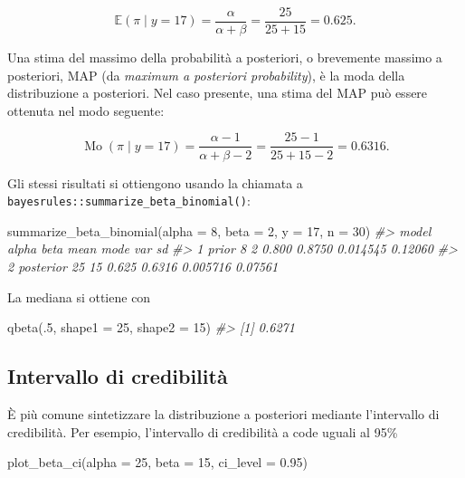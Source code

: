 \documentclass[
  11pt,
]{krantz}
\makeatletter
\newenvironment{Shaded}{\begin{snugshade}}{\end{snugshade}}
\newcommand{\AttributeTok}[1]{\textcolor[rgb]{0.61,0.61,0.61}{#1}}
\newcommand{\CommentTok}[1]{\textcolor[rgb]{0.37,0.37,0.37}{\textit{#1}}}
\newcommand{\DecValTok}[1]{\textcolor[rgb]{0.06,0.06,0.06}{#1}}
\newcommand{\FloatTok}[1]{\textcolor[rgb]{0.06,0.06,0.06}{#1}}
\newcommand{\FunctionTok}[1]{\textcolor[rgb]{0,0,0}{#1}}
\newcommand{\NormalTok}[1]{#1}
\newenvironment{kframe}{%
\medskip{}
\setlength{\fboxsep}{.8em}
 \def\at@end@of@kframe{}%
 \ifinner\ifhmode%
  \def\at@end@of@kframe{\end{minipage}}%
  \begin{minipage}{\columnwidth}%
 \fi\fi%
 \def\FrameCommand##1{\hskip\@totalleftmargin \hskip-\fboxsep
 \colorbox{shadecolor}{##1}\hskip-\fboxsep
     \hskip-\linewidth \hskip-\@totalleftmargin \hskip\columnwidth}%
 \MakeFramed {\advance\hsize-\width
   \@totalleftmargin\z@ \linewidth\hsize
   \@setminipage}}%
 {\par\unskip\endMakeFramed%
 \at@end@of@kframe}
\renewenvironment{Shaded}{\begin{kframe}}{\end{kframe}}
\DeclareMathOperator{\Mo}{Mo} %
\newcommand{\E}{\mathbb{E}} %
\theoremstyle{definition}
\theoremstyle{definition}
\theoremstyle{definition}
\theoremstyle{definition}
\theoremstyle{remark}
\makeatother
\begin{document}
\[
\E(\pi \mid y = 17) = \frac{\alpha}{\alpha + \beta} = \frac{25}{25+15} = 0.625.
\]

Una stima del massimo della probabilità a posteriori, o brevemente massimo a posteriori, MAP (da \emph{maximum a posteriori probability}), è la moda della distribuzione a posteriori. Nel caso presente, una stima del MAP può essere ottenuta nel modo seguente:

\[
\Mo(\pi \mid y = 17) = \frac{\alpha-1}{\alpha + \beta-2} = \frac{25-1}{25+15-2} = 0.6316.
\]

Gli stessi risultati si ottiengono usando la chiamata a \texttt{bayesrules::summarize\_beta\_binomial()}:

\begin{Shaded}
\begin{Highlighting}[]
\FunctionTok{summarize\_beta\_binomial}\NormalTok{(}\AttributeTok{alpha =} \DecValTok{8}\NormalTok{, }\AttributeTok{beta =} \DecValTok{2}\NormalTok{, }\AttributeTok{y =} \DecValTok{17}\NormalTok{, }\AttributeTok{n =} \DecValTok{30}\NormalTok{)}
\CommentTok{\#\textgreater{}       model alpha beta  mean   mode      var      sd}
\CommentTok{\#\textgreater{} 1     prior     8    2 0.800 0.8750 0.014545 0.12060}
\CommentTok{\#\textgreater{} 2 posterior    25   15 0.625 0.6316 0.005716 0.07561}
\end{Highlighting}
\end{Shaded}

La mediana si ottiene con

\begin{Shaded}
\begin{Highlighting}[]
\FunctionTok{qbeta}\NormalTok{(.}\DecValTok{5}\NormalTok{, }\AttributeTok{shape1 =} \DecValTok{25}\NormalTok{, }\AttributeTok{shape2 =} \DecValTok{15}\NormalTok{)}
\CommentTok{\#\textgreater{} [1] 0.6271}
\end{Highlighting}
\end{Shaded}

\hypertarget{intervallo-di-credibilituxe0-1}{%
\subsection{Intervallo di credibilità}\label{intervallo-di-credibilituxe0-1}}

È più comune sintetizzare la distribuzione a posteriori mediante l'intervallo di credibilità. Per esempio, l'intervallo di credibilità a code uguali al 95\%

\begin{Shaded}
\begin{Highlighting}[]
\FunctionTok{plot\_beta\_ci}\NormalTok{(}\AttributeTok{alpha =} \DecValTok{25}\NormalTok{, }\AttributeTok{beta =} \DecValTok{15}\NormalTok{, }\AttributeTok{ci\_level =} \FloatTok{0.95}\NormalTok{)}
\end{Highlighting}
\end{Shaded}
\end{document}
